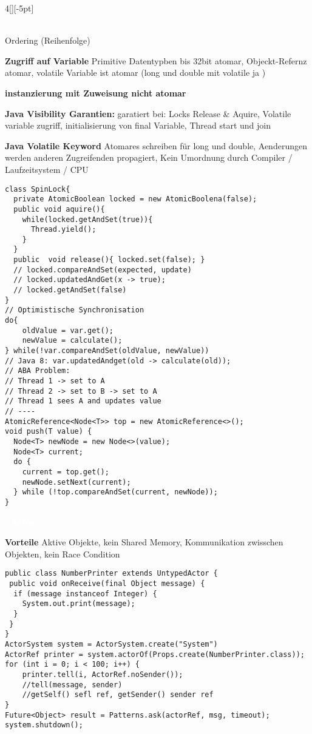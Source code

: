 \documentclass[%
	pdftex,%
	a4paper,%
	landscape,%
	ngerman,
	oneside,%
	6pt,%
	halfparskip,%
]{scrbook}
\newenvironment{mainbox}{%
  \def\FrameCommand{\fboxrule 1px \fcolorbox{black}{spec_blue}}%
  \MakeFramed {\advance\hsize-\width \FrameRestore}}%
 {\endMakeFramed}
\newcommand{\maintopic}[1]{\setcounter{subtopicenum}{0}\setcounter{subsubtopicenum}{0}\vspace{-4px}\begin{mainbox}\textcolor{white}{\textbf{\large{\stepcounter{maintopicenum}\Roman{maintopicenum}. #1}}}\end{mainbox}\vspace{-4px}}
\newenvironment{tight-itemize}
{ \begin{itemize}
    \setlength{\itemsep}{0px}
    \setlength{\parskip}{0px}
    \setlength{\parsep}{0px}  }
{ \end{itemize}                  }
\begin{document}
\begin{multicols}{4}[][-5pt]
\begin{tight-itemize}
{        \\ Ordering (Reihenfolge)}
    \item{\textbf{Zugriff auf Variable} Primitive Datentypben bis 32bit atomar, Objeckt-Refernz atomar, volatile Variable ist atomar (long und double mit volatile ja )}
    \item{\textbf{instanzierung mit Zuweisung nicht atomar} }
    \item{\textbf{Java Visibility Garantien:} garatiert bei: Locks Release \& Aquire, Volatile variable zugriff, initialisierung von final Variable, Thread start und join }
    \item{\textbf{Java Volatile Keyword} Atomares schreiben für long und double, Aenderungen werden anderen Zugreifenden propagiert, Kein Umordnung durch Compiler / Laufzeitsystem / CPU}
\end{tight-itemize}
\begin{lstlisting}
class SpinLock{
  private AtomicBoolean locked = new AtomicBoolena(false);
  public void aquire(){
    while(locked.getAndSet(true)){
      Thread.yield();
    }
  }
  public  void release(){ locked.set(false); }
  // locked.compareAndSet(expected, update)
  // locked.updatedAndGet(x -> true);
  // locked.getAndSet(false)
}
// Optimistische Synchronisation
do{
    oldValue = var.get();
    newValue = calculate();
} while(!var.compareAndSet(oldValue, newValue))
// Java 8: var.updatedAndget(old -> calculate(old));
// ABA Problem:
// Thread 1 -> set to A
// Thread 2 -> set to B -> set to A
// Thread 1 sees A and updates value
// ----
AtomicReference<Node<T>> top = new AtomicReference<>();
void push(T value) {
  Node<T> newNode = new Node<>(value);
  Node<T> current;
  do {
    current = top.get();
    newNode.setNext(current);
  } while (!top.compareAndSet(current, newNode));
}
\end{lstlisting}
\maintopic{Actor}
\begin{tight-itemize}
	\item{\textbf{Vorteile} Aktive Objekte, kein Shared Memory, Kommunikation zwisschen Objekten, kein Race Condition}
\end{tight-itemize}
\begin{lstlisting}
public class NumberPrinter extends UntypedActor {
 public void onReceive(final Object message) {
  if (message instanceof Integer) {
    System.out.print(message);
  }
 }
}
ActorSystem system = ActorSystem.create("System")
ActorRef printer = system.actorOf(Props.create(NumberPrinter.class));
for (int i = 0; i < 100; i++) {
    printer.tell(i, ActorRef.noSender());
    //tell(message, sender)
    //getSelf() sefl ref, getSender() sender ref
}
Future<Object> result = Patterns.ask(actorRef, msg, timeout);
system.shutdown();
\end{lstlisting}


\end{multicols}
\end{document}
